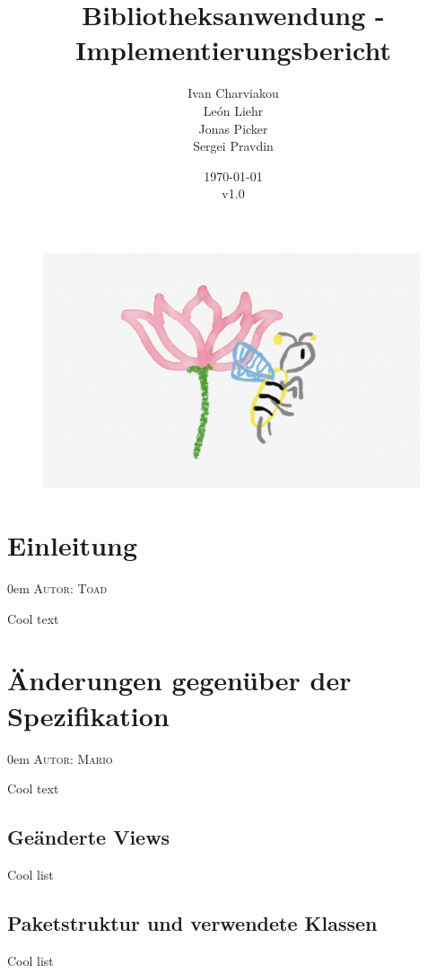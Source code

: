 \documentclass{article}
\title{Bibliotheksanwendung - Implementierungsbericht}
\date{\today\\v1.0}
\author{
	Ivan Charviakou\\
	León Liehr\\
	Jonas Picker\\
	Sergei Pravdin
}
\makeatletter
\newcommand{\sectionauthor}[1]{
	{\parindent 0em \large \scshape Autor: #1 \par \nobreak \vspace*{1em}}
	\@afterheading
}
\makeatother
\begin{document}
\maketitle
\begin{figure}[H]
	\centering
	\includegraphics[width = 30em]{Logo}
\end{figure}
\newpage
\tableofcontents
\newpage

\section{Einleitung}
\sectionauthor{Toad}
Cool text

\section{Änderungen gegenüber der Spezifikation}
\sectionauthor{Mario}
Cool text

\subsection{Geänderte Views}
Cool list

\subsection{Paketstruktur und verwendete Klassen}
Cool list
\end{document}
